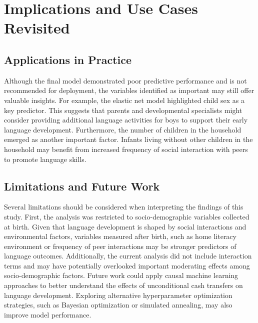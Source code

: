 \documentclass[sn-basic,pdflatex]{sn-jnl}
\begin{document}
\section{Implications and Use Cases
Revisited}\label{implications-and-use-cases-revisited}

\subsection{Applications in Practice}\label{applications-in-practice}

Although the final model demonstrated poor predictive performance and is
not recommended for deployment, the variables identified as important
may still offer valuable insights. For example, the elastic net model
highlighted child sex as a key predictor. This suggests that parents and
developmental specialists might consider providing additional language
activities for boys to support their early language development.
Furthermore, the number of children in the household emerged as another
important factor. Infants living without other children in the household
may benefit from increased frequency of social interaction with peers to
promote language skills.

\subsection{Limitations and Future
Work}\label{limitations-and-future-work}

Several limitations should be considered when interpreting the findings
of this study. First, the analysis was restricted to socio-demographic
variables collected at birth. Given that language development is shaped
by social interactions and environmental factors, variables measured
after birth, such as home literacy environment or frequency of peer
interactions may be stronger predictors of language outcomes.
Additionally, the current analysis did not include interaction terms and
may have potentially overlooked important moderating effects among
socio-demographic factors. Future work could apply causal machine
learning approaches to better understand the effects of unconditional
cash transfers on language development. Exploring alternative
hyperparameter optimization strategies, such as Bayesian optimization or
simulated annealing, may also improve model performance.

~


\end{document}
